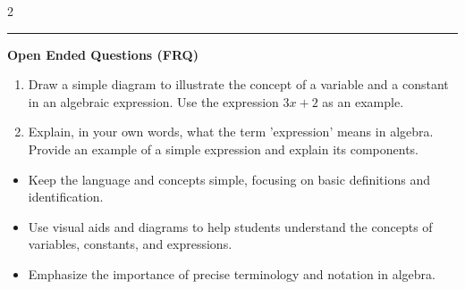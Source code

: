 \documentclass[10pt]{article}
\begin{document}
\begin{multicols}{2}
\begin{enumerate}[label=\textbf{Q\arabic*.}, leftmargin=*, itemsep=6pt, parsep=0pt]
\end{enumerate}
\end{multicols}

\vspace{-0.2cm}
\hrule
\vspace{0.2cm}
\textbf{\small Open Ended Questions (FRQ)}
\begin{enumerate}[label=\textbf{Q\arabic*.}, start=9, itemsep=5pt, topsep=0pt]

  \item \small Draw a simple diagram to illustrate the concept of a variable and a constant in an algebraic expression. Use the expression $3x + 2$ as an example. \vspace{2cm}

  \item \small Explain, in your own words, what the term 'expression' means in algebra. Provide an example of a simple expression and explain its components. \vspace{2cm}

\end{enumerate}

\vfill

\begin{tcolorbox}[colback=blue!5, colframe=mainblue!50, title=\small \textbf{Chef's Tips}, fonttitle=\bfseries, bottom=1mm]
\begin{itemize}[noitemsep, topsep=2pt, leftmargin=0.5cm]
  \item \scriptsize Keep the language and concepts simple, focusing on basic definitions and identification.\item \scriptsize Use visual aids and diagrams to help students understand the concepts of variables, constants, and expressions.\item \scriptsize Emphasize the importance of precise terminology and notation in algebra.
\end{itemize}
\end{tcolorbox}
\end{document}
